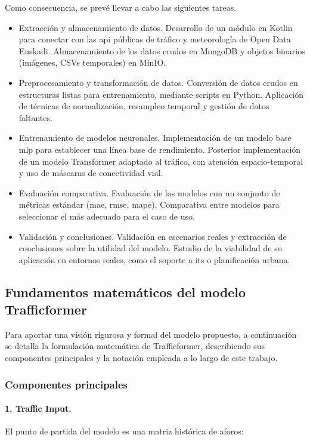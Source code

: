 Como consecuencia, se prevé llevar a cabo las siguientes tareas.

\begin{itemize}
	\item Extracción y almacenamiento de datos. Desarrollo de un módulo en Kotlin para conectar con las \acrshort{api} públicas de tráfico y meteorología de Open Data Euskadi. Almacenamiento de los datos crudos en MongoDB y objetos binarios (imágenes, CSVs temporales) en MinIO.
	\item Preprocesamiento y transformación de datos. Conversión de datos crudos en estructuras listas para entrenamiento, mediante scripts en Python. Aplicación de técnicas de normalización, resampleo temporal y gestión de datos faltantes.
	\item Entrenamiento de modelos neuronales. Implementación de un modelo base \acrshort{mlp} para establecer una línea base de rendimiento. Posterior implementación de un modelo Transformer adaptado al tráfico, con atención espacio-temporal y uso de máscaras de conectividad vial.
	\item Evaluación comparativa. Evaluación de los modelos con un conjunto de métricas estándar (\acrshort{mae}, \acrshort{rmse}, \acrshort{mape}). Comparativa entre modelos para seleccionar el más adecuado para el caso de uso.
	\item Validación y conclusiones. Validación en escenarios reales y extracción de conclusiones sobre la utilidad del modelo. Estudio de la viabilidad de su aplicación en entornos reales, como el soporte a \acrshort{its} o planificación urbana.
\end{itemize}

\subsection{Fundamentos matemáticos del modelo Trafficformer}

Para aportar una visión rigurosa y formal del modelo propuesto, a continuación se detalla la formulación matemática de Trafficformer, describiendo sus componentes principales y la notación empleada a lo largo de este trabajo.

\subsubsection*{Componentes principales}

\paragraph*{1. Traffic Input.}  
El punto de partida del modelo es una matriz histórica de aforos:


